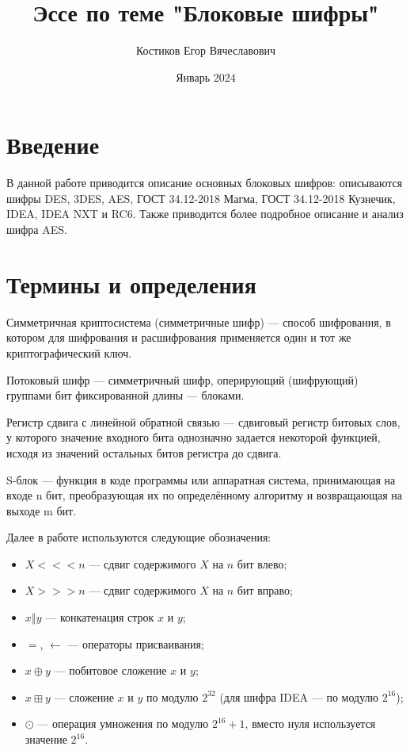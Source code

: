 \documentclass{./civarticle}
\title{Эссе по теме "Блоковые шифры"}
\author{Костиков Егор Вячеславович}
\date{Январь 2024}
\begin{document}
\maketitle

\section{Введение}

В данной работе приводится описание основных блоковых шифров: описываются шифры DES, 3DES, AES, ГОСТ 34.12-2018 Магма, ГОСТ 34.12-2018 Кузнечик, IDEA, IDEA NXT и RC6. Также приводится более подробное описание и анализ шифра AES.

\section{Термины и определения}

Симметричная криптосистема (симметричные шифр) --- способ шифрования, в котором для шифрования и расшифрования применяется один и тот же криптографический ключ.

Потоковый шифр ---  симметричный шифр, оперирующий (шифрующий) группами бит фиксированной длины --- блоками.

Регистр сдвига с линейной обратной связью --- сдвиговый регистр битовых слов, у которого значение входного бита однозначно задается некоторой функцией, исходя из значений остальных битов регистра до сдвига.

S-блок ---  функция в коде программы или аппаратная система, принимающая на входе n бит, преобразующая их по определённому алгоритму и возвращающая на выходе m бит.

Далее в работе используются следующие обозначения:
\begin{itemize}
    \item $X <<< n$ --- сдвиг содержимого $X$ на $n$ бит влево;
    \item $X >>> n$ --- сдвиг содержимого $X$ на $n$ бит вправо;
    \item $x \mathbin\Vert y$ --- конкатенация строк $x$ и $y$;
    \item $=$, $\leftarrow$ --- операторы присваивания;
    \item $x \oplus y$ --- побитовое сложение $x$ и $y$;
    \item $x \boxplus y$ --- сложение $x$ и $y$ по модулю $2^{32}$ (для шифра IDEA --- по модулю $2^{16}$);
    \item $\odot$ --- операция умножения по модулю $2^{16} + 1$, вместо нуля используется значение $2^{16}$.
\end{itemize}
\end{document}
